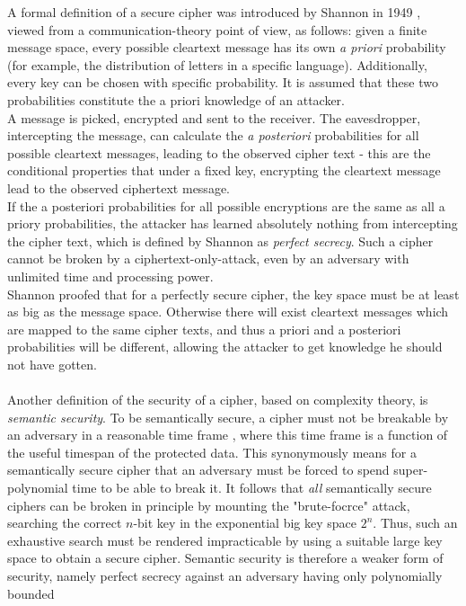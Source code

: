 A formal definition of a secure cipher was introduced by Shannon in 1949 \cite{6769090}, viewed from a communication-theory point of view, as follows:
given a finite message space, every possible cleartext message has its own \textit{a priori} probability (for example, the distribution of letters in a 
specific language). Additionally, every key can be chosen with specific probability. It is assumed that these
two probabilities constitute the a priori knowledge of an attacker.
\\
A message is picked, encrypted
and sent to the receiver. The eavesdropper, intercepting the message, can calculate the \textit{a posteriori} probabilities for all possible cleartext messages, 
leading to the observed cipher text - this are the conditional properties that under a fixed key, encrypting the cleartext message lead to the
observed ciphertext message.
\\
If the a posteriori probabilities for all possible encryptions are the same as all a priory probabilities, the attacker has learned absolutely
nothing from intercepting the cipher text, which is defined by Shannon as \textit{perfect secrecy}. Such a cipher cannot be broken by a ciphertext-only-attack,
even by an adversary with unlimited time and processing power.
\\
Shannon proofed that for a perfectly secure cipher, the key space must be at least as big as the message space.
Otherwise there will exist cleartext messages which are mapped to the same cipher texts, and thus a priori and a posteriori probabilities will be different,
allowing the attacker to get knowledge he should not have gotten. 
\\
\\
Another definition of the security of a cipher, based on complexity theory, is \textit{semantic security}.
To be semantically secure, a cipher must not be breakable by an adversary in a reasonable time
frame \cite{handbook1}, where this time frame is a function of the useful timespan of the protected data. This synonymously means for a semantically secure
cipher that an adversary must be forced to spend super-polynomial time to be able to break it. It follows that \textit{all} semantically secure ciphers
can be broken in principle by mounting the "brute-focrce" attack, searching the correct $n$-bit key in the exponential big key space $2^n$. Thus, such an
exhaustive search must be rendered impracticable by using a suitable large key space to obtain a secure cipher.
Semantic security is therefore a weaker form of security, namely perfect secrecy against an adversary having only polynomially bounded
